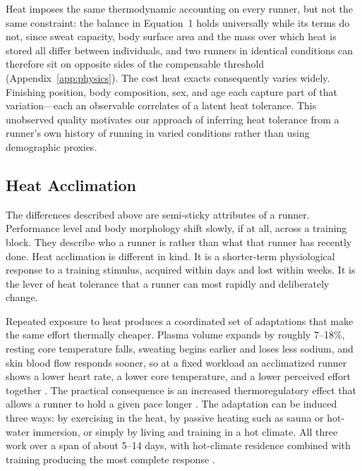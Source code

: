 \documentclass[11pt]{article}
\renewcommand{\_}{\textunderscore\allowbreak}
\begin{document}
Heat imposes the same thermodynamic accounting on every runner, but not the same constraint: the balance in Equation~1 holds universally while its terms do not, since sweat capacity, body surface area and the mass over which heat is stored all differ between individuals, and two runners in identical conditions can therefore sit on opposite sides of the compensable threshold (Appendix~\ref{app:physics}). The cost heat exacts consequently varies widely. Finishing position, body composition, sex, and age each capture part of that variation---each an observable correlates of a latent heat tolerance. This unobserved quality motivates our approach of inferring heat tolerance from a runner's own history of running in varied conditions rather than using demographic proxies.

\subsection{Heat Acclimation}

The differences described above are semi-sticky attributes of a runner. Performance level and body morphology shift slowly, if at all, across a training block. They describe who a runner is rather than what that runner has recently done. Heat acclimation is different in kind. It is a shorter-term physiological response to a training stimulus, acquired within days and lost within weeks. It is the lever of heat tolerance that a runner can most rapidly and deliberately change.

Repeated exposure to heat produces a coordinated set of adaptations that make the same effort thermally cheaper. Plasma volume expands by roughly 7--18\%, resting core temperature falls, sweating begins earlier and loses less sodium, and skin blood flow responds sooner, so at a fixed workload an acclimatized runner shows a lower heart rate, a lower core temperature, and a lower perceived effort together \citep{periard2015, tyler2016, tyler2024, racinais2017, gibson2020}. The practical consequence is an increased thermoregulatory effect that allows a runner to hold a given pace longer \citep{marino2008, rodrigues2020}. The adaptation can be induced three ways: by exercising in the heat, by passive heating such as sauna or hot-water immersion, or simply by living and training in a hot climate. All three work over a span of about 5--14 days, with hot-climate residence combined with training producing the most complete response \citep{garrett2011, periard2015, tyler2016, tyler2024, heathcote2018, pryor2019, schmit2017, brown2022}.
\end{document}
